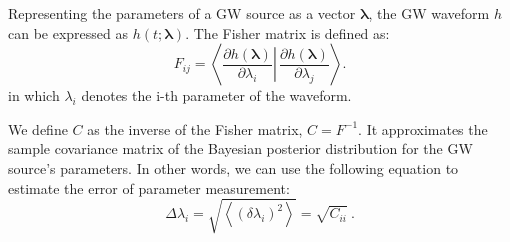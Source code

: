 \documentclass[%
 reprint,
 amsmath,amssymb,
 aps,
]{revtex4-2}
\newcommand{\xzy}[1]{\textcolor{red}{{\bf} #1}}
\begin{document}

Representing the parameters of a GW source as a vector $\boldsymbol{\lambda}$, the GW waveform $h$ can be expressed as $h(t;\boldsymbol{\lambda})$. The Fisher matrix is defined as:
\begin{equation}
    F_{ij} = \left\langle\left.\frac{\partial h(\boldsymbol{\lambda})}{\partial \lambda_i}\right\rvert\, \frac{\partial h(\boldsymbol{\lambda})}{\partial \lambda_j}\right\rangle.\label{eq:fisherdefinition}
\end{equation}
in which $\lambda_i$ denotes the i-th parameter of the waveform.

We define $C$ as the inverse of the Fisher matrix, $C = F^{-1}$. It approximates the sample covariance matrix of the Bayesian posterior distribution for the GW source's parameters. In other words, we can use the following equation to estimate the error of parameter measurement:
\begin{equation}
\Delta \lambda_{i}= \sqrt{\left\langle\left(\delta \lambda_{i}\right)^{2}\right\rangle}=\sqrt{C_{i i}}\ .\label{eq:delt_estimation}
\end{equation}
\end{document}
